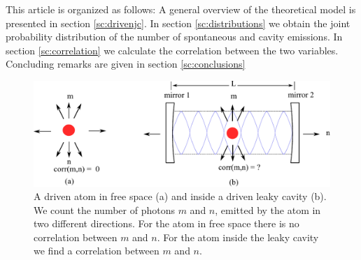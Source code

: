 \documentclass[%
 reprint,
 amsmath,amssymb,
 aps, 
]{revtex4-1}
\begin{document}
This article is organized as follows: A general overview of the
theoretical model is presented in section \ref{sc:drivenjc}. In
section \ref{sc:distributions} we obtain the joint probability
distribution of the  number of spontaneous and cavity emissions. In
section \ref{sc:correlation} we calculate the correlation between the
two variables. Concluding remarks are given in section
\ref{sc:conclusions}
\begin{center}
\begin{figure}
\includegraphics[scale = 0.65]{newimagepaper.pdf}
\caption{A driven atom in free space (a) and inside a driven leaky
  cavity (b). We count the number of photons $m$ and $n$, emitted by
  the atom in two different directions. For the atom in free space
  there is no correlation between $m$ and $n$. For the atom inside the
  leaky cavity we find a correlation between $m$ and $n$.}\label{asa}
\end{figure}
\end{center}
\end{document}
